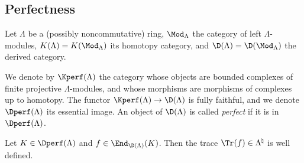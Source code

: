 \subsection{Perfectness}

Let $\Lambda$ be a (possibly noncommutative) ring, $\Mod_{\Lambda}$ the category of left $\Lambda$-modules, $K(\Lambda) = K(\Mod_\Lambda)$ its homotopy category, and $\D(\Lambda)= \D(\Mod_\Lambda)$ the derived category. 

\begin{defi}
We denote by $\Kperf(\Lambda)$ the category whose objects are bounded complexes of finite projective $\Lambda$-modules, and whose morphisms are morphisms of complexes up to homotopy. The functor $\Kperf(\Lambda)\to \D(\Lambda)$ is fully faithful, and we denote $\Dperf(\Lambda)$ its essential image. An object of $\D(\Lambda)$ is called \emph{perfect} if it is in $\Dperf(\Lambda)$.
\end{defi}

\begin{prop} \label{prop:TraceIsWellDefined}
Let $K\in \Dperf(\Lambda)$ and $f\in \End_{\D(\Lambda)}(K)$. Then the trace $\Tr(f)\in \Lambda^\natural$ is well defined. 
\end{prop}


